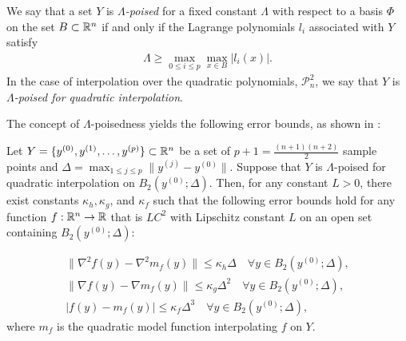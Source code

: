 We say that a set $Y$ is \emph{$\Lambda$-poised} for a fixed constant $\Lambda$ with respect to a basis $\Phi$ on the set 
$B \subset\mathbb R^n$ if and only if the Lagrange polynomials $l_i$ associated with $Y$ satisfy
\begin{align}
\Lambda \ge \max_{0\le i\le p}\max_{x\in B}|l_i(x)|.
\end{align}
In the case of interpolation over the quadratic polynomials, 
$ \mathcal{P}^2_n$, we say that $Y$ is \emph{$\Lambda$-poised for quadratic interpolation}.

\color{red}
The concept of $\Lambda$-poisedness yields the following error bounds, as shown in
 \cite[Theorem 3.16]{introduction_book}:

\begin{theorem}
\label{quadratic_errors}

Let $Y = \{y^{(0)}, y^{(1)}, \ldots, y^{(p)}\} \subset \mathbb R^n$ be a set of $p+1=\frac{(n+1)(n+2)}{2}$
sample points and $\Delta = \max_{1 \le j \le p} \|y^{(j)}-y^{(0)}\|$.
Suppose that $Y$ is $\Lambda$-poised for quadratic interpolation on $B_2(y^{(0)}; \Delta)$.
Then, for any constant $L > 0$, there exist constants $\kappa_{h}, \kappa_{g}$, and $\kappa_{f}$
such that the following error bounds hold for any function $f:\mathbb R^n \rightarrow \mathbb R$
that is $LC^2$ with Lipschitz constant $L$ on an open set containing $B_2(y^{(0)};\Delta)$:

\begin{align}
\|\nabla^2 f(y) - \nabla^2 m_f(y)\| \le \kappa_{h} \Delta \quad \forall y \in B_2(y^{(0)}; \Delta), \label{error_in_hessian}\\
\|\nabla f(y) - \nabla m_f(y)\| \le \kappa_{g} \Delta^2 \quad \forall y \in B_2(y^{(0)}; \Delta), \label{error_in_gradient} \\
|f(y) - m_f(y) | \le \kappa_{f} \Delta^3 \quad \forall y \in B_2(y^{(0)}; \Delta), \label{error_in_function} 
\end{align}
where $m_f$ is the quadratic model function interpolating $f$ on $Y$.
\end{theorem}

